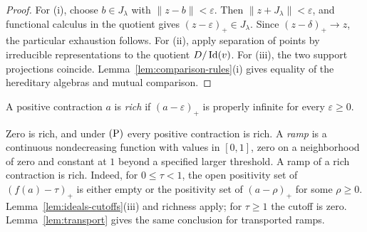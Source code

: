 \begin{proof}
For (i), choose \(b\in J_\lambda\) with \(\|z-b\|<\varepsilon\).
Then \(\|z+J_\lambda\|<\varepsilon\), and functional calculus in
the quotient gives \((z-\varepsilon)_+\in J_\lambda\).
Since \((z-\delta)_+\to z\), the particular exhaustion follows.
For (ii), apply separation of points by irreducible representations
to the quotient \(D/\operatorname{Id}(v)\).  For (iii), the two support
projections coincide.  Lemma~\ref{lem:comparison-rules}(i) gives
equality of the hereditary algebras and mutual comparison.
\end{proof}

\begin{definition}\label{def:rich}
A positive contraction \(a\) is \emph{rich} if
\((a-\varepsilon)_+\) is properly infinite for every
\(\varepsilon\ge0\).
\end{definition}

Zero is rich, and under \(\textup{(P)}\) every positive contraction is
rich.  A \emph{ramp} is a continuous nondecreasing function with
values in \([0,1]\), zero on a neighborhood of zero and constant
at \(1\) beyond a specified larger threshold.  A ramp of a rich
contraction is rich.  Indeed, for \(0\le\tau<1\), the open
positivity set of \((f(a)-\tau)_+\) is either empty or the
positivity set of \((a-\rho)_+\) for some \(\rho\ge0\).
Lemma~\ref{lem:ideals-cutoffs}(iii) and richness apply; for
\(\tau\ge1\) the cutoff is zero.  Lemma~\ref{lem:transport}
gives the same conclusion for transported ramps.

